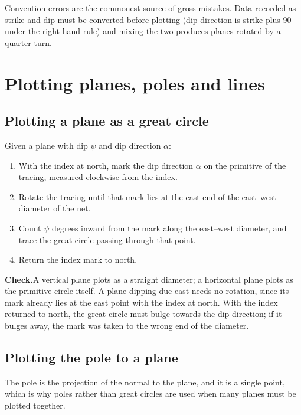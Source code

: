 Convention errors are the commonest source of gross mistakes. Data recorded as
strike and dip must be converted before plotting (dip direction is strike
plus $90^\circ$ under the right-hand rule) and mixing the two produces
planes rotated by a quarter turn.

\section{Plotting planes, poles and lines}
\label{sec:plotting-planes-poles-and-lines}

\subsection{Plotting a plane as a great circle}
\label{sec:construct-great-circle}

Given a plane with dip $\psi$ and dip direction $\alpha$:

\begin{enumerate}
  \item With the index at north, mark the dip direction $\alpha$ on the
        primitive of the tracing, measured clockwise from the index.
  \item Rotate the tracing until that mark lies at the east end of the
        east--west diameter of the net.
  \item Count $\psi$ degrees inward from the mark along the east--west
        diameter, and trace the great circle passing through that point.
  \item Return the index mark to north.
\end{enumerate}

\noindent\textbf{Check.}\enspace A vertical plane plots as a straight diameter;
a horizontal plane plots as the primitive circle itself. A plane dipping due
east needs no rotation, since its mark already lies at the east point
with the index at north. With the index returned to north, the great circle
must bulge towards the dip direction; if it bulges away, the mark was taken
to the wrong end of the diameter.

\subsection{Plotting the pole to a plane}
\label{sec:construct-pole}

The pole is the projection of the normal to the plane, and it is a single
point, which is why poles rather than great circles are used when many
planes must be plotted together.

